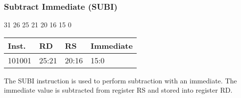 \documentclass[12pt]{article}
\begin{document}

    \newpage
    \subsubsection{Subtract Immediate (SUBI)}
    
    \hspace{1.6cm}31 \hspace{1.15cm}26 \hspace{.05cm}25 \hspace{.8cm}21 \hspace{.05cm}20 \hspace{.8cm}16 \hspace{.05cm}15 \hspace{6.4cm}0
    \vspace{-.25cm}
    \begin{center}
        \begin{tabular}{ |p{1.8cm}|p{1.5cm}|p{1.5cm}|p{6.8cm}| }
            \hline
            \textbf{Inst.} & \textbf{RD} &  \textbf{RS} & \textbf{Immediate}\\
            \hline
            101001& 25:21 & 20:16 &15:0\\
            \hline
        \end{tabular}
    \end{center}
    
    \noindent
    The SUBI instruction is used to perform subtraction with an immediate. The immediate value is subtracted from register RS and stored into register RD. 
    
\end{document}
